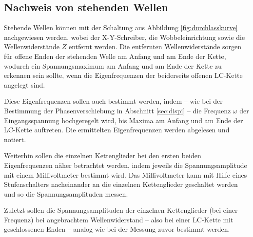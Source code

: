 \subsection{Nachweis von stehenden Wellen}

Stehende Wellen können mit der Schaltung aus Abbildung \ref{fig:durchlasskurve} nachgewiesen
werden, wobei der X-Y-Schreiber, die Wobbeleinrichtung sowie die Wellenwiderstände $Z$ entfernt
werden. Die entfernten Wellenwiderstände sorgen für offene Enden der stehenden Welle am Anfang
und am Ende der Kette, wodurch ein Spannungsmaximum am Anfang und am Ende der Kette zu erkennen
sein sollte, wenn die Eigenfrequenzen der beiderseits offenen LC-Kette angelegt sind.

Diese Eigenfrequenzen sollen auch bestimmt werden, indem -- wie bei der Bestimmung der Phasenverschiebung in Abschnitt \ref{sec:dispi} --
die Frequenz $\omega$ der Eingangsspannung hochgeregelt wird, bis Maxima am Anfang und am Ende der LC-Kette auftreten. Die ermittelten Eigenfrequenzen werden abgelesen und notiert.

Weiterhin sollen die einzelnen Kettenglieder bei den ersten beiden Eigenfrequenzen näher betrachtet werden, indem jeweils die Spannungsamplitude mit einem Millivoltmeter bestimmt wird.
Das Millivoltmeter kann mit Hilfe eines Stufenschalters nacheinander an die einzelnen
Kettenglieder geschaltet werden und so die Spannungsamplituden messen.

Zuletzt sollen die Spannungsamplituden der einzelnen Kettenglieder (bei einer Frequenz) bei angebrachtem Wellenwiderstand -- also bei einer LC-Kette mit geschlossenen Enden -- analog wie bei der Messung zuvor bestimmt werden.

